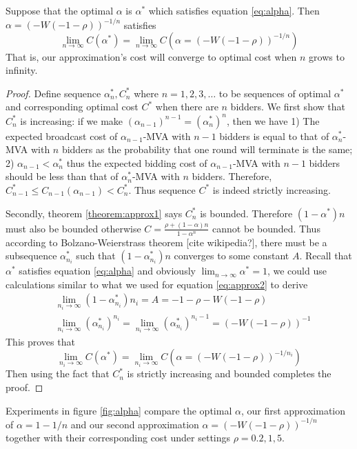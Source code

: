 \begin{theorem}\label{theorem:approx1}
Suppose that the optimal $\alpha$ is $\alpha^*$ which
satisfies equation \ref{eq:alpha}. Then $\alpha = (-W(-1-\rho))^{-1/n}$ satisfies
$$\lim_{n \rightarrow \infty} C(\alpha^*) = \lim_{n \rightarrow \infty} C(\alpha = (-W(-1-\rho))^{-1/n})$$
That is, our approximation's cost will converge to optimal cost when $n$ grows to
infinity.
\end{theorem}

\begin{proof}
Define sequence $\alpha^*_n, C^*_n$ where $n = 1, 2, 3, \ldots$ to be sequences of
optimal $\alpha^*$ and corresponding optimal cost $C^*$ when there are $n$
bidders. We first show that $C^*_n$ is increasing: if we make
$(\alpha_{n-1})^{n-1} = (\alpha^*_n)^n$, then we have 1) The expected broadcast
cost of $\alpha_{n-1}$-MVA with $n-1$ bidders is equal to that of
$\alpha^*_n$-MVA with $n$ bidders as the probability that one round will
terminate is the same; 2) $\alpha_{n-1} < \alpha^*_n$ thus the expected bidding
cost of $\alpha_{n-1}$-MVA with $n-1$ bidders should be less than that of
$\alpha^*_n$-MVA with $n$ bidders. Therefore, $C^*_{n-1} \leq C_{n-1}(\alpha_{n-1}) < C^*_n$.
Thus sequence $C^*$ is indeed strictly increasing.

Secondly, theorem \ref{theorem:approx1} says $C^*_n$ is bounded. Therefore
$(1-\alpha^*)n$ must also be bounded otherwise $C = \frac{\rho+(1-\alpha)n}{1-\alpha^n}$ cannot be bounded.
Thus according to Bolzano-Weierstrass theorem [cite wikipedia?], there must be
a subsequence $\alpha^*_{n_i}$ such that $(1-\alpha^*_{n_i})n$ converges to some constant $A$.
Recall that $\alpha^*$ satisfies equation \ref{eq:alpha} and obviously $\lim_{n \rightarrow \infty} \alpha^* = 1$, 
we could use calculations similar to what we used for equation \ref{eq:approx2} to derive
\begin{align*}
&\lim_{n_i \rightarrow \infty} (1-\alpha^*_{n_i})n_i = A = -1-\rho-W(-1-\rho)\\
&\lim_{n_i \rightarrow \infty} (\alpha^*_{n_i})^{n_i} = \lim_{n_i \rightarrow \infty} (\alpha^*_{n_i})^{n_i-1} = (-W(-1-\rho))^{-1}
\end{align*}
This proves that
$$\lim_{n_i \rightarrow \infty} C(\alpha^*) = \lim_{n_i \rightarrow \infty} C(\alpha = (-W(-1-\rho))^{-1/n_i})$$
Then using the fact that $C^*_n$ is strictly increasing and bounded completes the proof.
\end{proof}

Experiments in figure \ref{fig:alpha} compare the optimal $\alpha$, our first approximation
of $\alpha = 1-1/n$ and our second approximation $\alpha = (-W(-1-\rho))^{-1/n}$
together with their corresponding cost under settings $\rho = 0.2, 1, 5$.

